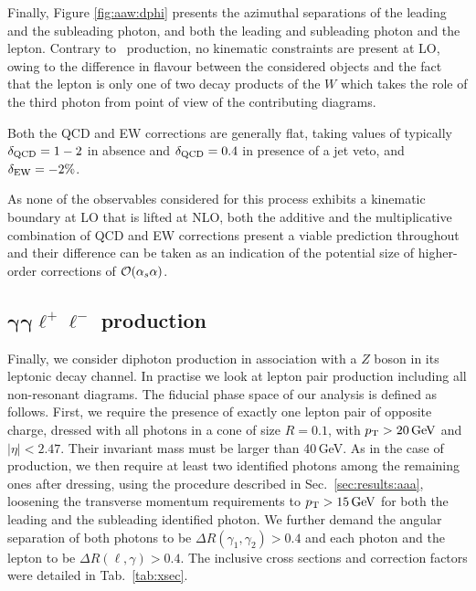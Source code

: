 Finally, Figure \ref{fig:aaw:dphi} presents the azimuthal 
separations of the leading and the subleading photon, and 
both the leading and subleading photon and the lepton. 
Contrary to \aaa\ production, no kinematic constraints 
are present at LO, owing to the difference in flavour 
between the considered objects and the fact that the 
lepton is only one of two decay products of the $W$ which 
takes the role of the third photon from point of view of 
the contributing diagrams. 

Both the QCD and EW corrections are generally flat, taking 
values of typically $\delta_\text{QCD}=1-2$ in absence and 
$\delta_\text{QCD}=0.4$ in presence of a jet veto, and 
$\delta_\text{EW}=-2\%$.


As none of the observables considered for this process 
exhibits a kinematic boundary at LO that is lifted at 
NLO, both the additive and the multiplicative combination 
of QCD and EW corrections present a viable prediction 
throughout and their difference can be taken as an 
indication of the potential size of higher-order corrections 
of $\mathcal{O}(\alpha_s\alpha)$.



\subsection[\texorpdfstring{$\gamma\gamma\ell^+\ell^-$}{aall} production]
           {$\boldsymbol{\gamma\gamma\ell^+\ell^-}$ production}
\label{sec:results:aaz}

Finally, we consider diphoton production in association with 
a $Z$ boson in its leptonic decay channel. 
In practise we look at lepton pair production including 
all non-resonant diagrams.
The fiducial phase space of our analysis is defined as follows. 
First, we require the presence of exactly one lepton pair 
of opposite charge, dressed with all photons in a cone of 
size $R=0.1$, with $p_\text{T}>20\,\text{GeV}$ and $|\eta|<2.47$. 
Their invariant mass must be larger than 40\,GeV. 
As in the case of \aaw production, we then require at least 
two identified photons among the remaining ones after dressing, 
using the procedure described in Sec.\ \ref{sec:results:aaa}, 
loosening the transverse momentum requirements to 
$p_\text{T}>15\,\text{GeV}$ for both the leading and the subleading 
identified photon. 
We further demand the angular separation of both photons 
to be $\Delta R(\gamma_1,\gamma_2)>0.4$ and each photon and 
the lepton to be $\Delta R(\ell,\gamma)>0.4$.
The inclusive cross sections and correction factors were 
detailed in Tab.\ \ref{tab:xsec}.

